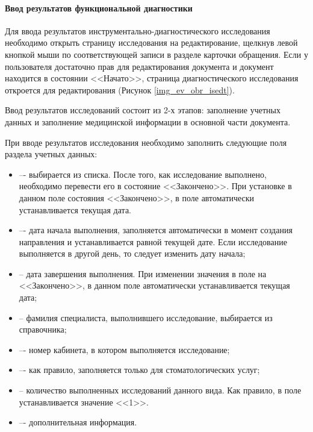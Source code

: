 {\paragraph{Ввод результатов функциональной диагностики} \label{ev_obr_isrez}

Для ввода результатов инструментально-диагностического исследования необходимо открыть страницу исследования на редактирование, щелкнув левой кнопкой мыши по соответствующей записи в разделе  карточки обращения. Если у пользователя достаточно прав для редактирования документа и документ находится в состоянии <<Начато>>, страница диагностического исследования откроется для редактирования (Рисунок \ref{img_ev_obr_isedt}). 

Ввод результатов исследований состоит из 2-х этапов: заполнение учетных данных и заполнение медицинской информации в основной части документа.

При вводе результатов исследования необходимо заполнить следующие поля раздела учетных данных:
\begin{itemize}
 \item {} –- выбирается из списка. После того, как  исследование выполнено, необходимо перевести его в состояние <<Закончено>>. При установке в данном поле состояния <<Закончено>>, в поле  автоматически устанавливается текущая дата.
 \item {} –- дата начала выполнения, заполняется автоматически в момент создания направления и устанавливается равной текущей дате. Если исследование выполняется в другой день, то следует изменить дату начала;
 \item {} -- дата завершения выполнения. При изменении значения в поле  на <<Закончено>>, в данном поле автоматически устанавливается текущая дата;
 \item {} -- фамилия специалиста, выполнившего исследование, выбирается из справочника;
 \item {} –- номер кабинета, в котором выполняется исследование;
 \item {} –- как правило, заполняется только для стоматологических услуг;
 \item {} -- количество выполненных исследований данного вида. Как правило, в поле устанавливается значение <<1>>.
 \item {} –- дополнительная информация.
\end{itemize}

}
